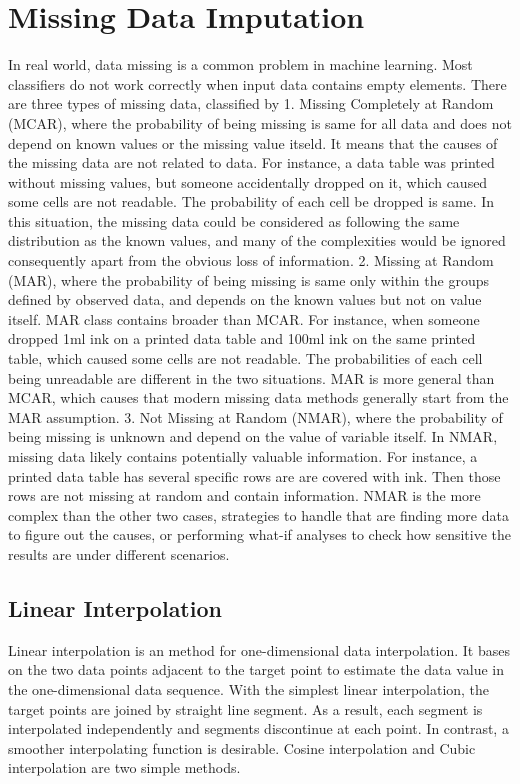 \documentclass[12pt,a4paper,english
]{tunithesis}
\begin{document}
\section{Missing Data Imputation}
In real world, data missing is a common problem in machine learning. Most classifiers do not work correctly when input data contains empty elements.
There are three types of missing data, classified by \textcite{rubin1976}
1. Missing Completely at Random (MCAR), where the probability of being missing is same for all data and does not depend on known values or the missing value itseld. It means that the causes of the missing data are not related to data. For instance, a data table was printed without missing values, but someone accidentally dropped on it, which caused some cells are not readable. The probability of each cell be dropped is same. In this situation, the missing data could be considered as following the same distribution as the known values, and many of the complexities would be ignored consequently apart from the obvious loss of information.
2. Missing at Random (MAR), where the probability of being missing is same only within the groups defined by observed data, and depends on the known values but not on value itself. MAR class contains broader than MCAR. For instance, when someone dropped 1ml ink on a printed data table and 100ml ink on the same printed table, which caused some cells are not readable. The probabilities of each cell being unreadable are different in the two situations. MAR is more general than MCAR, which causes that modern missing data methods generally start from the MAR assumption.
3. Not Missing at Random (NMAR), where the probability of being missing is unknown and depend on the value of variable itself. In NMAR, missing data likely contains potentially valuable information. For instance, a printed data table has several specific rows are are covered with ink. Then those rows are not missing at random and contain information. NMAR is the more complex than the other two cases, strategies to handle that are finding more data to figure out the causes, or performing what-if analyses to check how sensitive the results are under different scenarios. \parencite{vanbuuren2018}
\subsection{Linear Interpolation}
Linear interpolation is an method for one-dimensional data interpolation. It bases on the two data points adjacent to the target point to estimate the data value in the one-dimensional data sequence. With the simplest linear interpolation, the target points are joined by straight line segment. As a result, each segment is interpolated independently and segments discontinue at each point. \parencite{huang2021, paul1999}
In contrast, a smoother interpolating function is desirable. Cosine interpolation and Cubic interpolation are two simple methods.
\end{document}
